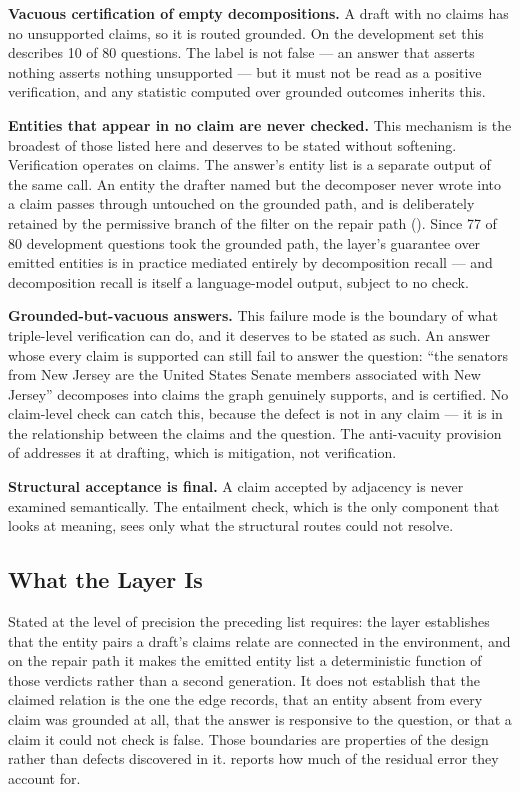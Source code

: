 \textbf{Vacuous certification of empty decompositions.} A draft with no claims
has no unsupported claims, so it is routed \textsf{grounded}. On the development
set this describes 10 of 80 questions. The label is not false --- an answer that
asserts nothing asserts nothing unsupported --- but it must not be read as a
positive verification, and any statistic computed over \textsf{grounded}
outcomes inherits this.

\textbf{Entities that appear in no claim are never checked.} This mechanism is
the broadest of those listed here and deserves to be stated without
softening. Verification operates on claims. The answer's entity list is a
separate output of the same call. An entity the drafter named but the decomposer
never wrote into a claim passes through untouched on the grounded path, and is
deliberately retained by the permissive branch of the filter on the repair path
(). Since 77 of 80 development questions took the
grounded path, the layer's guarantee over emitted entities is in practice
mediated entirely by decomposition recall --- and decomposition recall is itself
a language-model output, subject to no check.

\textbf{Grounded-but-vacuous answers.} This failure mode is the boundary of
what triple-level verification can do, and it deserves to be stated as such.
An answer whose every claim is supported can still fail to answer the question:
``the senators from New Jersey are the United States Senate members associated
with New Jersey'' decomposes into claims the graph genuinely supports, and is
certified. No claim-level check can catch this, because the defect is not in any
claim --- it is in the relationship between the claims and the question. The
anti-vacuity provision of  addresses it at
drafting, which is mitigation, not verification.

\textbf{Structural acceptance is final.} A claim accepted by adjacency is never
examined semantically. The entailment check, which is the only component that
looks at meaning, sees only what the structural routes could not resolve.

\subsection*{What the Layer Is}

Stated at the level of precision the preceding list requires: the layer
establishes that the entity pairs a draft's claims relate are connected in the
environment, and on the repair path it makes the emitted entity list a
deterministic function of those verdicts rather than a second generation. It
does not establish that the claimed relation is the one the edge records, that
an entity absent from every claim was grounded at all, that the answer is
responsive to the question, or that a claim it could not check is false. Those
boundaries are properties of the design rather than defects discovered in it.
 reports how much of the residual error they account
for.

\endinput
